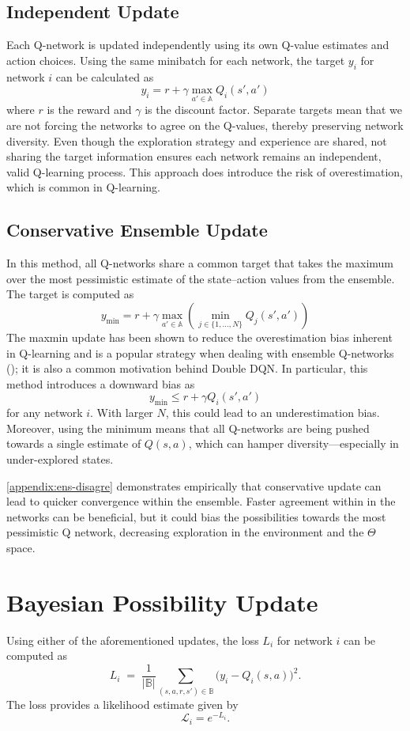 \documentclass[11pt,a4paper]{report}
\begin{document}
\subsection{Independent Update}
Each Q-network is updated independently using its own Q-value estimates and action choices. Using the same minibatch for each network, the target \(y_i\) for network \(i\) can be calculated as 
\[
  y_i = r + \gamma \max_{a' \in \mathbb{A}} Q_i(s', a')
\]
where \(r\) is the reward and \(\gamma\) is the discount factor. Separate targets mean that we are not forcing the networks to agree on the Q-values, thereby preserving network diversity. Even though the exploration strategy and experience are shared, not sharing the target information ensures each network remains an independent, valid Q-learning process. This approach does introduce the risk of overestimation, which is common in Q-learning.

\subsection{Conservative Ensemble Update}
In this method, all Q-networks share a common target that takes the maximum over the most pessimistic estimate of the state–action values from the ensemble. The target is computed as
\[
  y_{\min} = r + \gamma \max_{a' \in \mathbb{A}} \left( \min_{j \in \{1, \dots, N\}} Q_j(s', a') \right)
\]
The maxmin update has been shown to reduce the overestimation bias inherent in Q-learning and is a popular strategy when dealing with ensemble Q-networks (\cite{lan2021maxminq}); it is also a common motivation behind Double DQN. In particular, this method introduces a downward bias as
\[
  y_{\min} \le r + \gamma Q_i(s', a')
\]
for any network \(i\). With larger \(N\), this could lead to an underestimation bias. Moreover, using the minimum means that all Q-networks are being pushed towards a single estimate of \(Q(s,a)\), which can hamper diversity—especially in under-explored states.
\par
\ref{appendix:ens-disagre} demonstrates empirically that conservative update can lead to quicker convergence within the ensemble. Faster agreement within in the networks can be beneficial, but it could bias the possibilities towards the most pessimistic Q network, decreasing exploration in the environment and the $\Theta$ space.

\section{Bayesian Possibility Update}
Using either of the aforementioned updates, the loss \(L_i\) for network \(i\) can be computed as 
\[
L_i \;=\;\frac{1}{|\mathbb{B}|}\sum_{(s,a,r,s')\in\mathbb{B}}
\bigl(y_i - Q_i(s,a)\bigr)^{2}.
\] 
The loss provides a likelihood estimate given by
\[
  \mathcal{L}_i = e^{-L_i}.
\]
\end{document}
